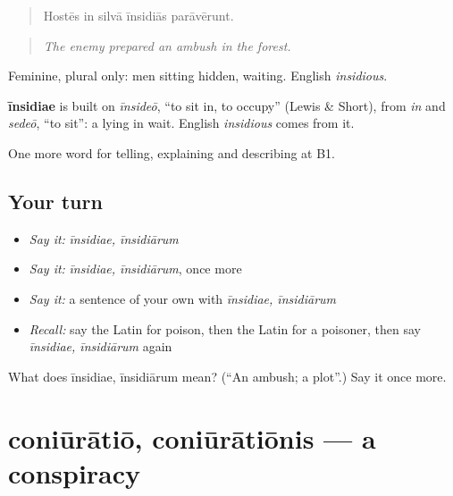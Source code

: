 \begin{quote}
Hostēs in silvā īnsidiās parāvērunt.
\end{quote}

\begin{quote}
\emph{The enemy prepared an ambush in the forest.}
\end{quote}

Feminine, plural only: men sitting hidden, waiting. English \emph{insidious}.

\begin{cousinweb}
\textbf{īnsidiae} is built on \emph{īnsideō}, \textquotedblleft{}to sit in, to occupy\textquotedblright{} (Lewis \& Short), from \emph{in} and \emph{sedeō}, \textquotedblleft{}to sit\textquotedblright{}: a lying in wait. English \emph{insidious} comes from it.
\end{cousinweb}

\begin{grammarlens}[title={What you've built}]
One more word for telling, explaining and describing at B1.
\end{grammarlens}

\subsection*{Your turn}
\begin{itemize}
\raggedright
  \item \emph{Say it:} \emph{īnsidiae, īnsidiārum}
  \item \emph{Say it:} \emph{īnsidiae, īnsidiārum}, once more
  \item \emph{Say it:} a sentence of your own with \emph{īnsidiae, īnsidiārum}
  \item \emph{Recall:} say the Latin for poison, then the Latin for a poisoner, then say \emph{īnsidiae, īnsidiārum} again
\end{itemize}

\begin{tcolorbox}[breakable,colback=teal!4,colframe=teal!35!black,title={Before you move on}]
What does īnsidiae, īnsidiārum mean? (\textquotedblleft{}An ambush; a plot\textquotedblright{}.) Say it once more.
\end{tcolorbox}
\section[coniūrātiō, coniūrātiōnis]{coniūrātiō, coniūrātiōnis — a conspiracy}

\label{lesson:LA-C307-coniuratio}



